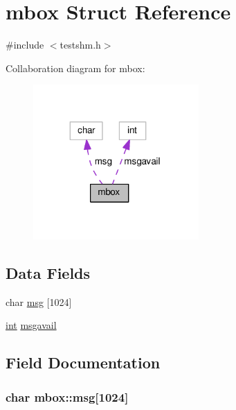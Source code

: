 \hypertarget{structmbox}{}\section{mbox Struct Reference}
\label{structmbox}


{\ttfamily \#include $<$testshm.\+h$>$}



Collaboration diagram for mbox\+:
\nopagebreak
\begin{figure}[H]
\begin{center}
\leavevmode
\includegraphics[width=179pt]{structmbox__coll__graph}
\end{center}
\end{figure}
\subsection*{Data Fields}
\begin{DoxyCompactItemize}
\item 
char \hyperlink{structmbox_af55f8857b9ece84aa667bb01b93080c7}{msg} \mbox{[}1024\mbox{]}
\item 
\hyperlink{pcre_8txt_a42dfa4ff673c82d8efe7144098fbc198}{int} \hyperlink{structmbox_ae67643a32ec75158e9f1ffd7f7e0906f}{msgavail}
\end{DoxyCompactItemize}


\subsection{Field Documentation}
\subsubsection[{\texorpdfstring{msg}{msg}}]{\setlength{\rightskip}{0pt plus 5cm}char mbox\+::msg\mbox{[}1024\mbox{]}}\hypertarget{structmbox_af55f8857b9ece84aa667bb01b93080c7}{}\label{structmbox_af55f8857b9ece84aa667bb01b93080c7}
